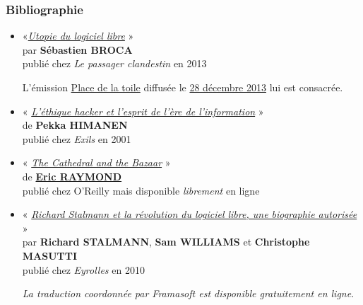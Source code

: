 \documentclass[10pt]{beamer}
\begin{document}
\begin{frame}
  \frametitle{Bibliographie}

  \begin{itemize}
  \item
    «\emph{\href{http://lepassagerclandestin.fr/catalogue/essais/utopie-du-logiciel-libre.html}{Utopie du logiciel libre}} » \hfill
    \\
    par \textbf{Sébastien BROCA} \\
    publié chez \emph{Le passager clandestin} en 2013

    {\small\slshape

      L'émission \href{http://www.franceculture.fr/emission-place-de-la-toile-politique-du-logiciel-libre-2013-12-28}{Place de la toile} diffusée le \href{http://rf.proxycast.org/841402162318675968/10465-28.12.2013-ITEMA_20567547-0.mp3}{28 décembre 2013} lui est consacrée.}

    \vfill

  \item « \emph{\href{http://www.amazon.fr/LEthique-Hacker-lEsprit-l\%C3\%A8re-linformation/dp/2912969298}{L'éthique hacker et l'esprit de l'ère de l'information}} »\\
    de \textbf{Pekka HIMANEN}\\
    publié chez \emph{Exils} en 2001

    \vfill

  \item « \emph{\href{http://www.catb.org/~esr/writings/homesteading/}{The Cathedral and the Bazaar}} »\\
    de \textbf{\href{http://www.catb.org/esr}{Eric RAYMOND}}\\
    publié chez O'Reilly mais disponible \emph{librement} en ligne

    \vfill

  \item « \emph{\href{http://framabook.org/richard-stallman-et-la-revolution-du-logiciel-libre}{Richard Stalmann et la révolution du logiciel libre, une biographie autorisée}} »\\
    par \textbf{Richard STALMANN}, \textbf{Sam WILLIAMS} et \textbf{Christophe MASUTTI}\\
    publié chez \emph{Eyrolles} en 2010

    {\small\slshape La traduction coordonnée par Framasoft est disponible gratuitement en ligne}.

  \end{itemize}
\end{frame}
\end{document}
